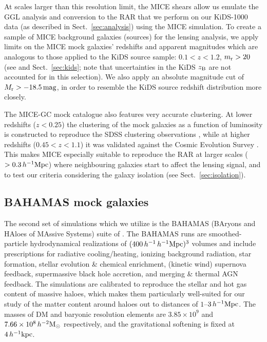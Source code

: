 \documentclass[usenatbib]{mnras}
\newcommand{\hmsun}{\,h^{-2} {\rm M_\odot}}
\newcommand{\hkpc}{\, h^{-1}{\rm{kpc}} }
\newcommand{\hMpc}{\, h^{-1}{\rm{Mpc}} }
\newcommand{\un}[1]{_{\rm #1}}
\begin{document}
At scales larger than this resolution limit, the MICE shears allow us emulate the GGL analysis and conversion to the RAR that we perform on our KiDS-1000 data (as described in Sect.~\ref{sec:analysis}) using the MICE simulation. To create a sample of MICE background galaxies (sources) for the lensing analysis, we apply limits on the MICE mock galaxies' redshifts and apparent magnitudes which are analogous to those applied to the KiDS source sample: $0.1 < z < 1.2$, $m\un{r}>20$ (see \citealp{hildebrandt2017} and Sect.~\ref{sec:kids}; note that uncertainties in the KiDS $z\un{B}$ are not accounted for in this selection). We also apply an absolute magnitude cut of $M\un{r}>-18.5 \, {\rm mag}$, in order to resemble the KiDS source redshift distribution more closely.

The MICE-GC mock catalogue also features very accurate clustering. At lower redshifts ($z<0.25$) the clustering of the mock galaxies as a function of luminosity is constructed to reproduce the SDSS clustering observations \cite[]{zehavi2011}, while at higher redshifts ($0.45<z<1.1$) it was validated against the Cosmic Evolution Survey \cite[COSMOS,][]{ilbert2009}. This makes MICE especially suitable to reproduce the RAR at larger scales ($>0.3\hMpc$) where neighbouring galaxies start to affect the lensing signal, and to test our criteria considering the galaxy isolation (see Sect.~\ref{sec:isolation}).


\subsection{BAHAMAS mock galaxies}
\label{sec:bahamas_mocks}
The second set of simulations which we utilize is the BAHAMAS (BAryons and HAloes of MAssive Systems) suite of \citet{mccarthy2017}. The BAHAMAS runs are smoothed-particle hydrodynamical realizations of $(400\,h^{-1}\hMpc)^3$ volumes and include prescriptions for radiative cooling/heating, ionizing background radiation, star formation, stellar evolution \& chemical enrichment, (kinetic wind) supernova feedback, supermassive black hole accretion, and merging \& thermal AGN feedback. The simulations are calibrated to reproduce the stellar and hot gas content of massive haloes, which makes them particularly well-suited for our study of the matter content around haloes out to distances of $1$--$3\hMpc$. The masses of DM and baryonic resolution elements are $3.85\times 10^9$ and $7.66\times 10^8 \hmsun$ respectively, and the gravitational softening is fixed at $4 \hkpc$.
\end{document}
